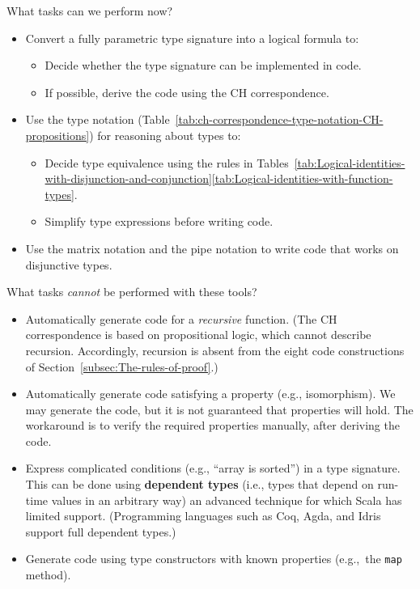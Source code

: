 What tasks can we perform now?
\begin{itemize}
\item Convert a fully parametric type signature into a logical formula to:
\begin{itemize}
\item Decide whether the type signature can be implemented in code.
\item If possible, derive the code using the CH correspondence.
\end{itemize}
\item Use the type notation (Table~\ref{tab:ch-correspondence-type-notation-CH-propositions})
for reasoning about types to:
\begin{itemize}
\item Decide type equivalence using the rules in Tables~\ref{tab:Logical-identities-with-disjunction-and-conjunction}\textendash \ref{tab:Logical-identities-with-function-types}.
\item Simplify type expressions before writing code.
\end{itemize}
\item Use the matrix notation and the pipe notation to write code that works
on disjunctive types.
\end{itemize}
What tasks \emph{cannot} be performed with these tools?
\begin{itemize}
\item Automatically generate code for a \emph{recursive} function. (The
CH correspondence is based on propositional logic, which cannot describe
recursion. Accordingly, recursion is absent from the eight code constructions
of Section~\ref{subsec:The-rules-of-proof}.)
\item Automatically generate code satisfying a property (e.g., isomorphism).
We may generate the code, but it is not guaranteed that properties
will hold. The workaround is to verify the required properties manually,
after deriving the code.
\item Express complicated conditions (e.g., \textsf{``}array is sorted\textsf{''}) in a
type signature. This can be done using \textbf{dependent types}
(i.e., types that depend on run-time values in an arbitrary way) \textemdash{}
an advanced technique for which Scala has limited support. (Programming
languages such as Coq, Agda, and Idris support full dependent types.)
\item Generate code using type constructors with known properties (e.g.,\ the
\lstinline!map! method).
\end{itemize}
